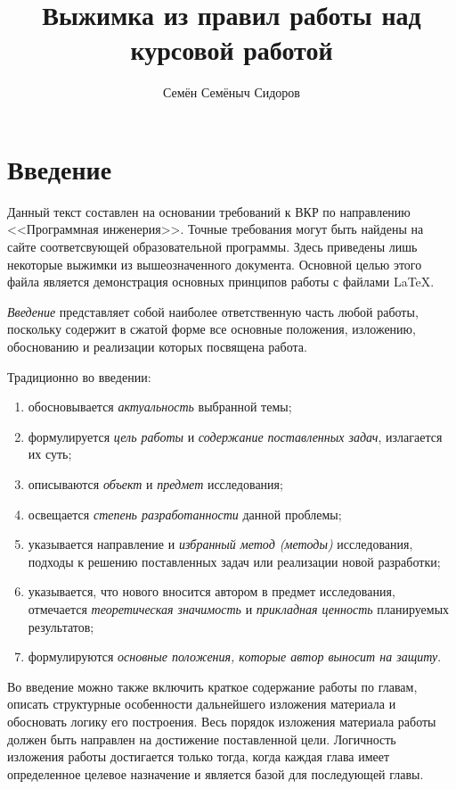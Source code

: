 \documentclass[PI,VKR]{HSEUniversity}
\title{Выжимка из правил работы над курсовой работой}
\author{Семён Семёныч Сидоров}
\begin{document}
\maketitle

\chapter*{Введение}

Данный текст составлен на основании требований к ВКР по направлению <<Программная инженерия>>. Точные требования могут быть найдены на сайте соответсвующей образовательной программы. Здесь приведены лишь некоторые выжимки из вышеозначенного документа. Основной целью этого файла является демонстрация основных принципов работы с файлами \LaTeX{}.

\emph{Введение} представляет собой наиболее ответственную часть любой работы, поскольку содержит в сжатой форме все основные положения, изложению, обоснованию и реализации которых посвящена работа.

Традиционно во введении:
\begin{enumerate}
	\item  обосновывается \emph{актуальность} выбранной темы;
	\item  формулируется \emph{цель работы} и \emph{содержание поставленных задач}, излагается их суть;
	\item  описываются \emph{объект} и \emph{предмет} исследования;
	\item  освещается \emph{степень разработанности} данной проблемы;
	\item  указывается направление и \emph{избранный метод (методы)} исследования, подходы к решению поставленных задач или реализации новой разработки;
	\item  указывается, что нового вносится автором в предмет исследования, отмечается \emph{теоретическая значимость} и \emph{прикладная ценность} планируемых результатов;
	\item  формулируются \emph{основные положения, которые автор выносит на защиту}.
\end{enumerate}

Во введение можно также включить краткое содержание работы по главам, описать структурные особенности дальнейшего изложения материала и обосновать логику его построения. Весь порядок изложения материала работы должен быть направлен на достижение поставленной цели. Логичность изложения работы достигается только тогда, когда каждая глава имеет определенное целевое назначение и является базой для последующей главы.
\end{document}
